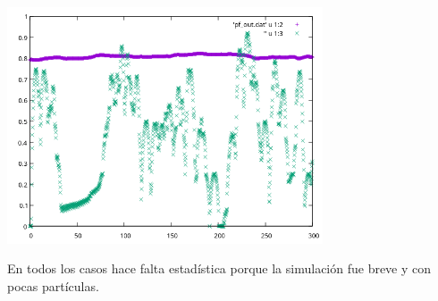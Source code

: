 \documentclass[11pt]{article}
\begin{document}
\begin{enumerate}
\begin{center}
  \includegraphics[width=0.7\textwidth]{figs/pf_t.png}
\end{center}
En todos los casos hace falta estadística porque la simulación fue breve y con
pocas partículas.
\end{enumerate}
\end{document}
